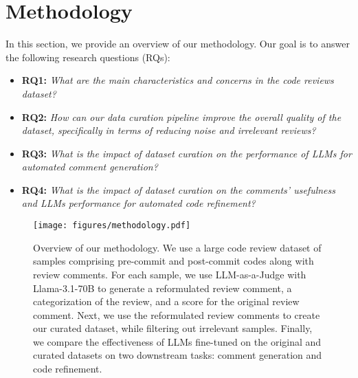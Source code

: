 \section{Methodology}
\label{sec:methodology}

In this section, we provide an overview of our methodology. Our goal is to answer the following research questions (RQs):
\begin{itemize}
    \item \textbf{RQ1:} \emph{What are the main characteristics and concerns in the code reviews dataset?}
    \item \textbf{RQ2:} \emph{How can our data curation pipeline improve the overall quality of the dataset, specifically in terms of reducing noise and irrelevant reviews?}
    \item \textbf{RQ3:} \emph{What is the impact of dataset curation on the performance of LLMs for automated comment generation?}
    \item \textbf{RQ4:} \emph{What is the impact of dataset curation on the comments' usefulness and LLMs performance for automated code refinement?}
\end{itemize}

\begin{figure*}[!h]
    \centering
    \texttt{[image: figures/methodology.pdf]}
    \caption{Overview of our methodology. We use a large code review dataset of samples comprising pre-commit and post-commit codes along with review comments. For each sample, we use LLM-as-a-Judge with Llama-3.1-70B to generate a reformulated review comment, a categorization of the review, and a score for the original review comment. Next, we use the reformulated review comments to create our curated dataset, while filtering out irrelevant samples. Finally, we compare the effectiveness of LLMs fine-tuned on the original and curated datasets on two downstream tasks: comment generation and code refinement.}
    \label{fig:methodology}
    \vspace{-.5em}
\end{figure*}

\begin{comment}
\begin{figure*}[!htbp]
    \centering
    \texttt{[image: figures/methodology.png]}
    \caption{Overview of the proposed methodology.}
    \label{fig:methodology}
\end{figure*}
\end{comment}

